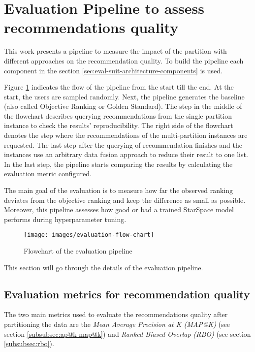 \section{Evaluation Pipeline to assess recommendations quality}
\label{sec:evaluation-pipeline}
This work presents a pipeline to measure the impact of the partition with different approaches on the recommendation quality. To build the pipeline each component in the section \ref{sec:eval-suit-architecture-components} is used. 

Figure \ref{fig:flowchart-evaluation-pipeline} indicates the flow of the pipeline from the start till the end. At the start, the users are sampled randomly. Next, the pipeline generates the baseline (also called Objective Ranking or Golden Standard). The step in the middle of the flowchart describes querying recommendations from the single partition instance to check the results' reproducibility. The right side of the flowchart denotes the step where the recommendations of the multi-partition instances are requested. The last step after the querying of recommendation finishes and the instances use an arbitrary data fusion approach to reduce their result to one list. In the last step, the pipeline starts comparing the results by calculating the evaluation metric configured. 

The main goal of the evaluation is to measure how far the observed ranking deviates from the objective ranking and keep the difference as small as possible. Moreover, this pipeline assesses how good or bad a trained StarSpace model performs during hyperparameter tuning.

\begin{figure}[!h]
    \centering
    \texttt{[image: images/evaluation-flow-chart]}
    \caption{Flowchart of the evaluation pipeline}
    \label{fig:flowchart-evaluation-pipeline}
\end{figure}


This section will go through the details of the evaluation pipeline.

\subsection{Evaluation metrics for recommendation quality}
\label{subsec:evaluation-metrics-for-recommendation-quality}
The two main metrics used to evaluate the recommendations quality after partitioning the data are the \emph{Mean Average Precision at K (MAP@K)} (see section \ref{subsubsec:ap@k-map@k})  and \emph{Ranked-Biased Overlap (RBO)} (see section \ref{subsubsec:rbo}). 



